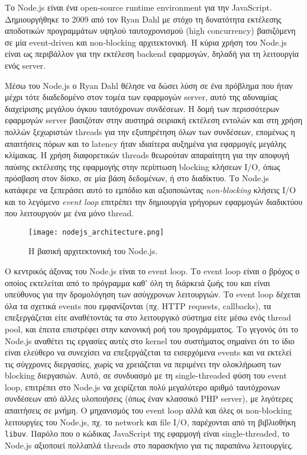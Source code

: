 \documentclass[../thesis.tex]{subfiles}
\begin{document}
Το Node.js είναι ένα open-source runtime environment για την JavaScript.
Δημιουργήθηκε το 2009 από τον Ryan Dahl με στόχο τη δυνατότητα εκτέλεσης αποδοτικών προγραμμάτων υψηλού ταυτοχρονισμού (high concurrency) βασιζόμενη σε μία event-driven και non-blocking αρχιτεκτονική.
Η κύρια χρήση του Node.js είναι ως περιβάλλον για την εκτέλεση backend εφαρμογών, δηλαδή για τη λειτουργία ενός server.

Μέσω του Node.js ο Ryan Dahl θέλησε να δώσει λύση σε ένα πρόβλημα που ήταν μέχρι τότε διαδεδομένο στον τομέα των εφαρμογών server, αυτό της αδυναμίας διαχείρισης μεγάλου όγκου ταυτόχρονων συνδέσεων.
Η δομή των περισσότερων εφαρμογών server βασιζόταν στην αυστηρά σειριακή εκτέλεση εντολών και στη χρήση πολλών ξεχωριστών threads για την εξυπηρέτηση όλων των συνδέσεων, επομένως η απαιτήσεις πόρων και το latency ήταν ιδιαίτερα αυξημένα για εφαρμογές μεγάλης κλίμακας.
Η χρήση διαφορετικών threads θεωρούταν απαραίτητη για την αποφυγή παύσης εκτέλεσης της εφαρμογής στην περίπτωση blocking κλήσεων I/O, όπως πρόσβαση στον δίσκο, σε μία βάση δεδομένων, ή στο διαδίκτυο.
Το Node.js κατάφερε να ξεπεράσει αυτό το εμπόδιο και αξιοποιώντας \textit{non-blocking} κλήσεις I/O και το λεγόμενο \textit{event loop} επιτρέπει την δημιουργία γρήγορων εφαρμογών διαδικτύου που λειτουργούν με ένα μόνο thread.

\begin{figure}[!ht]
    \texttt{[image: nodejs\_architecture.png]}
    \centering
    \caption{Η βασική αρχιτεκτονική του Node.js\cite{node_architecture_diagram}.}
\end{figure}

Ο κεντρικός άξονας του Node.js είναι το event loop.
Το event loop είναι ο βρόχος ο οποίος εκτελείται από το πρόγραμμα καθ' όλη τη διάρκειά ζωής του και είναι υπεύθυνος για την δρομολόγηση των ασύγχρονων λειτουργιών.
Το event loop δέχεται όλα τα σχετικά events που εμφανίζονται (πχ. HTTP requests, callbacks), τα επεξεργάζεται είτε αναθέτοντάς τα στο λειτουργικό σύστημα είτε μέσω ενός thread pool, και έπειτα επιστρέφει στην κανονική ροή του προγράμματος\cite{node_docs_eventloop}. 
Το γεγονός ότι το Node.js αναθέτει τις εργασίες αυτές στο kernel του συστήματος σημαίνει ότι το ίδιο είναι ελεύθερο να συνεχίσει να επεξεργάζεται τα εισερχόμενα events και να εκτελεί τις σύγχρονες διεργασίες, χωρίς να χρειάζεται να περιμένει την ολοκλήρωση των blocking διεργασιών.
Αυτό, σε συνδυασμό με τη single-threaded φύση του event loop, επιτρέπει στο Node.js να χειρίζεται πολύ μεγαλύτερο αριθμό ταυτόχρονων συνδέσεων από άλλες υλοποιήσεις (όπως έναν κλασσικό PHP server), με λιγότερες απαιτήσεις σε μνήμη.
Ο μηχανισμός του event loop αλλά και όλες οι non-blocking λειτουργίες του Node.js, πχ. το network και file I/O, παρέχονται από τη βιβλιοθήκη \texttt{libuv}.
Παρόλο που ο κώδικας JavaScript της εφαρμογή είναι single-threaded, το Node.js αξιοποιεί πολλαπλά threads στο παρασκήνιο για τις παραπάνω λειτουργίες.
\end{document}
